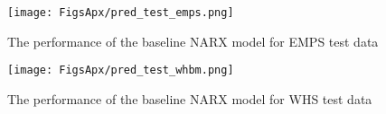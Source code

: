 \documentclass{article}
\begin{document}
\begin{figure}[htpb]
    \centering
    \texttt{[image: FigsApx/pred\_test\_emps.png]}
    \caption{The performance of the baseline NARX model for EMPS test data}
    \label{fig:pre_emps}
\end{figure}

\begin{figure}[htpb]
    \centering
    \texttt{[image: FigsApx/pred\_test\_whbm.png]}
    \caption{The performance of the baseline NARX model for WHS test data}
    \label{fig:pre_whbm}
\end{figure}


\newpage



\end{document}
